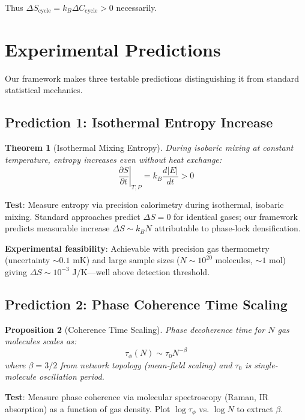 \documentclass[superscriptaddress,prb,10pt]{revtex4-2}
\newtheorem{theorem}{Theorem}
\newtheorem{proposition}[theorem]{Proposition}
\theoremstyle{definition}
\theoremstyle{remark}
\begin{document}
Thus $\Delta S_{\text{cycle}} = k_B \Delta C_{\text{cycle}} > 0$ necessarily.

\section{Experimental Predictions}
\label{sec:predictions}

Our framework makes three testable predictions distinguishing it from standard statistical mechanics.

\subsection{Prediction 1: Isothermal Entropy Increase}

\begin{theorem}[Isothermal Mixing Entropy]
During isobaric mixing at constant temperature, entropy increases even without heat exchange:
\begin{equation}
\left.\frac{\partial S}{\partial t}\right|_{T,P} = k_B \frac{d|E|}{dt} > 0
\end{equation}
\end{theorem}

\textbf{Test}: Measure entropy via precision calorimetry during isothermal, isobaric mixing. Standard approaches predict $\Delta S = 0$ for identical gases; our framework predicts measurable increase $\Delta S \sim k_B N$ attributable to phase-lock densification.

\textbf{Experimental feasibility}: Achievable with precision gas thermometry (uncertainty $\sim 0.1$ mK) and large sample sizes ($N \sim 10^{20}$ molecules, $\sim 1$ mol) giving $\Delta S \sim 10^{-3}$ J/K—well above detection threshold.

\subsection{Prediction 2: Phase Coherence Time Scaling}

\begin{proposition}[Coherence Time Scaling]
Phase decoherence time for $N$ gas molecules scales as:
\begin{equation}
\tau_{\phi}(N) \sim \tau_0 N^{-\beta}
\end{equation}
where $\beta = 3/2$ from network topology (mean-field scaling) and $\tau_0$ is single-molecule oscillation period.
\end{proposition}

\textbf{Test}: Measure phase coherence via molecular spectroscopy (Raman, IR absorption) as a function of gas density. Plot $\log \tau_{\phi}$ vs. $\log N$ to extract $\beta$.
\end{document}
